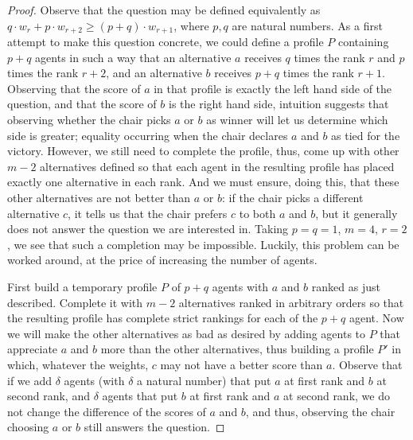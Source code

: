 \begin{proof}
Observe that the question may be defined equivalently as $q \cdot w_{r} + p \cdot w_{r+2} ≥ (p + q) \cdot w_{r+1}$, where $p, q$ are natural numbers. 
As a first attempt to make this question concrete, we could define a profile $P$
containing $p+q$ agents
in such a way that an alternative $a$ receives $q$ times the rank $r$ and $p$ times the rank $r+2$, and an alternative $b$ receives $p+q$ times the rank $r+1$. 
Observing that the score of $a$ in that profile is exactly the left hand side of the question, and that the score of $b$ is the right hand side, intuition suggests that observing whether the chair picks $a$ or $b$ as winner will let us determine which side is greater; equality occurring when the chair declares $a$ and $b$ as tied for the victory. 
However, we still need to complete the profile, thus, come up with other $m-2$ alternatives defined so that each agent in the resulting profile has placed exactly one alternative in each rank.
And we must ensure, doing this, that these other alternatives are not better than $a$ or $b$: if the chair picks a different alternative $c$, it tells us that the chair prefers $c$ to both $a$ and $b$, 
but it generally does not  answer the question we are interested in. 
Taking $p = q = 1$, $m=4$, $r=2$, we see that such a completion may be impossible. Luckily, this problem can be worked around, at the price of increasing the number of agents. 

First build a temporary profile $P$ of $p+q$ agents with $a$ and $b$ ranked as just described. Complete it with $m-2$ alternatives ranked in arbitrary orders so that the resulting profile has complete strict rankings for each of the $p+q$ agent. Now we will make the other alternatives as bad as desired by adding agents to $P$ that appreciate $a$ and $b$ more than the other alternatives, thus building a profile $P'$ in which, whatever the weights, $c$ may not have a better score than $a$. Observe that if we add $\delta$ agents (with $\delta$ a natural number) that put $a$ at first rank and $b$ at second rank, and $\delta$ agents that put $b$ at first rank and $a$ at second rank, we do not change the difference of the scores of $a$ and $b$, and thus, observing the chair choosing $a$ or $b$ still answers the question.


\end{proof}
